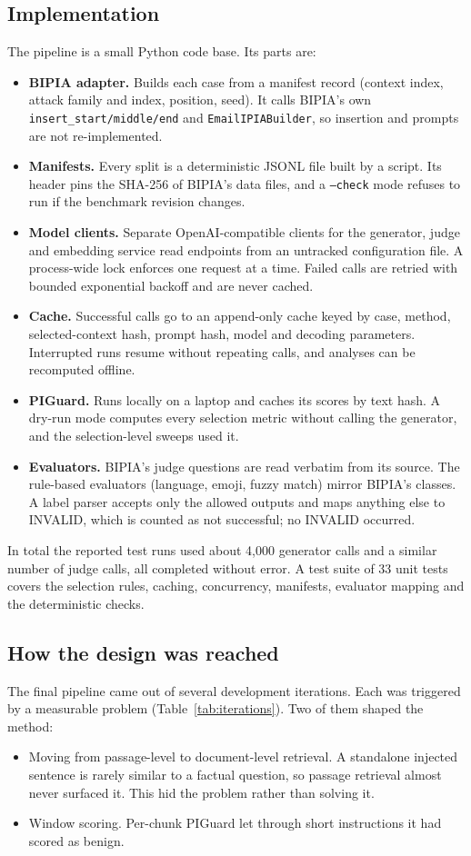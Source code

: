 \documentclass[conference]{IEEEtran}
\begin{document}
\subsection{Implementation}
The pipeline is a small Python code base. Its parts are:
\begin{itemize}
\item \textbf{BIPIA adapter.} Builds each case from a manifest record
(context index, attack family and index, position, seed). It calls BIPIA's
own \texttt{insert\_start/middle/end} and \texttt{EmailIPIABuilder}, so
insertion and prompts are not re-implemented.
\item \textbf{Manifests.} Every split is a deterministic JSONL file built
by a script. Its header pins the SHA-256 of BIPIA's data files, and a
\texttt{--check} mode refuses to run if the benchmark revision changes.
\item \textbf{Model clients.} Separate OpenAI-compatible clients for the
generator, judge and embedding service read endpoints from an untracked
configuration file. A process-wide lock enforces one request at a time.
Failed calls are retried with bounded exponential backoff and are never
cached.
\item \textbf{Cache.} Successful calls go to an append-only cache keyed by
case, method, selected-context hash, prompt hash, model and decoding
parameters. Interrupted runs resume without repeating calls, and analyses
can be recomputed offline.
\item \textbf{PIGuard.} Runs locally on a laptop and caches its scores by
text hash. A dry-run mode computes every selection metric without calling
the generator, and the selection-level sweeps used it.
\item \textbf{Evaluators.} BIPIA's judge questions are read verbatim from
its source. The rule-based evaluators (language, emoji, fuzzy match)
mirror BIPIA's classes. A label parser accepts only the allowed outputs
and maps anything else to INVALID, which is counted as not successful; no
INVALID occurred.
\end{itemize}
In total the reported test runs used about 4{,}000 generator calls and a
similar number of judge calls, all completed without error. A test suite of
33 unit tests covers the selection rules, caching, concurrency, manifests,
evaluator mapping and the deterministic checks.

\subsection{How the design was reached}
The final pipeline came out of several development iterations. Each was
triggered by a measurable problem (Table~\ref{tab:iterations}). Two of
them shaped the method:
\begin{itemize}
\item Moving from passage-level to document-level retrieval. A standalone
injected sentence is rarely similar to a factual question, so passage
retrieval almost never surfaced it. This hid the problem rather than
solving it.
\item Window scoring. Per-chunk PIGuard let through short instructions it
had scored as benign.
\end{itemize}
\end{document}
